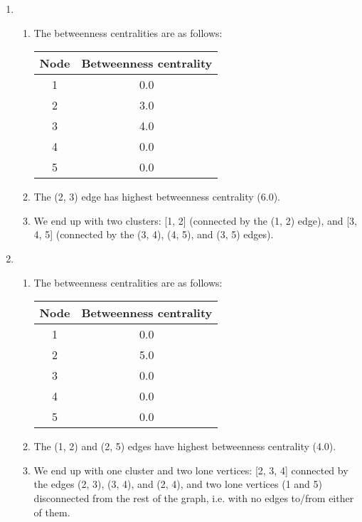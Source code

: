 \documentclass[12pt]{article}
\begin{document}
\begin{enumerate}
    \item \begin{enumerate}
        \item The betweenness centralities are as follows:\\
            \begin{tabular}{|c|c|}
                \hline
                \textbf{Node} & \textbf{Betweenness centrality}\\
                \hline
                1 & 0.0 \\
                2 & 3.0 \\
                3 & 4.0 \\
                4 & 0.0 \\
                5 & 0.0 \\
                \hline
            \end{tabular}
        \item The (2, 3) edge has highest betweenness centrality (6.0).
        \item We end up with two clusters: [1, 2] (connected by the (1, 2) edge), and [3, 4, 5] (connected by the (3, 4), (4, 5), and (3, 5) edges).
    \end{enumerate}
    \item \begin{enumerate}
        \item The betweenness centralities are as follows:\\
            \begin{tabular}{|c|c|}
                \hline
                \textbf{Node} & \textbf{Betweenness centrality}\\
                \hline
                1 & 0.0 \\
                2 & 5.0 \\
                3 & 0.0 \\
                4 & 0.0 \\
                5 & 0.0 \\
                \hline
            \end{tabular}
        \item The (1, 2) and (2, 5) edges have highest betweenness centrality (4.0).
        \item We end up with one cluster and two lone vertices: [2, 3, 4] connected by the edges (2, 3), (3, 4), and (2, 4), and two lone vertices (1 and 5) disconnected from the rest of the graph, i.e. with no edges to/from either of them.
    \end{enumerate}

\end{enumerate}
\end{document}
